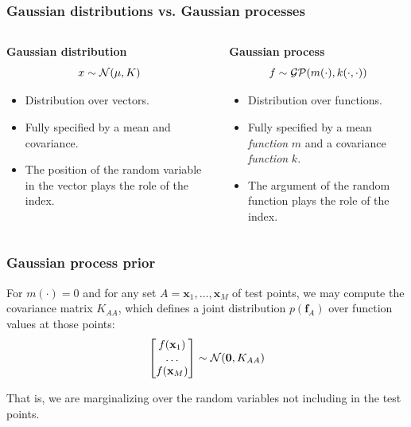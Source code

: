 \documentclass{beamer}
\begin{document}
\begin{frame}
    \frametitle{Gaussian distributions vs. Gaussian processes}

    \begin{columns}[t]
        \begin{column}{0.5\textwidth}
            {\bf Gaussian distribution}
            $$x \sim {\cal N}(\mu, K)$$

            \begin{itemize}
                \item Distribution over vectors.
                \item Fully specified by a mean and covariance.
                \item The position of the random variable in the vector plays the role of the index.
            \end{itemize}

        \end{column}
        \begin{column}{0.5\textwidth}
            {\bf Gaussian process}
            $$f \sim {\cal GP}(m(\cdot), k(\cdot,\cdot))$$

            \begin{itemize}
                \item Distribution over functions.
                \item Fully specified by a mean {\it function} $m$ and a covariance {\it function} $k$.
                \item The argument of the random function plays the role of the index.
            \end{itemize}

        \end{column}
    \end{columns}

\end{frame}


\begin{frame}
    \frametitle{Gaussian process prior}

    For $m(\cdot)=0$ and for any set  $A = \mathbf{x}_1, \dots,
    \mathbf{x}_M$ of test points, we may compute the covariance matrix $K_{AA}$, which defines a joint distribution $p(\mathbf{f}_A)$
    over function values at those points:
    $$\begin{bmatrix} f(\mathbf{x}_1)\\
                      \dots \\
                      f(\mathbf{x}_M) \end{bmatrix} \sim {\cal N}(\mathbf{0}, K_{AA})$$

    That is, we are marginalizing over the random variables not including in the test points.

\end{frame}
\end{document}
